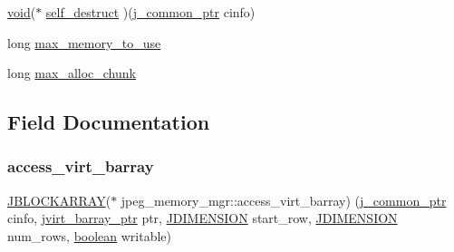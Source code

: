 \begin{DoxyCompactItemize}
\item 
\hyperlink{png_8h_ac9c84fa68bbad002983e35ce3663c686}{void}($\ast$ \hyperlink{structjpeg__memory__mgr_a495eef3a25dd3a34161a4e6f671cc6d7}{self\+\_\+destruct} )(\hyperlink{jpeglib_8h_a1a177ab705cefea8f30ec31a48e62650}{j\+\_\+common\+\_\+ptr} cinfo)
\item 
long \hyperlink{structjpeg__memory__mgr_aa7ef7c0d7ffbfcbee837ae9cb8b12c7e}{max\+\_\+memory\+\_\+to\+\_\+use}
\item 
long \hyperlink{structjpeg__memory__mgr_a0301712c8796bb5555093d72b37c5a58}{max\+\_\+alloc\+\_\+chunk}
\end{DoxyCompactItemize}


\subsection{Field Documentation}
\mbox{\label{structjpeg__memory__mgr_aad382fe923ef84b780a0fb6d6af0e6a0}} 
\subsubsection{\texorpdfstring{access\+\_\+virt\+\_\+barray}{access\_virt\_barray}}
{\footnotesize\ttfamily \hyperlink{jpeglib_8h_ab03cfeb937b60b9b73ca6e3cf935af49}{J\+B\+L\+O\+C\+K\+A\+R\+R\+AY}($\ast$ jpeg\+\_\+memory\+\_\+mgr\+::access\+\_\+virt\+\_\+barray) (\hyperlink{jpeglib_8h_a1a177ab705cefea8f30ec31a48e62650}{j\+\_\+common\+\_\+ptr} cinfo, \hyperlink{jpeglib_8h_a994f4cba141d82ded90af38e51223f0b}{jvirt\+\_\+barray\+\_\+ptr} ptr, \hyperlink{jmorecfg_8h_a04ed4674f6f1d0d50ec241531e38274f}{J\+D\+I\+M\+E\+N\+S\+I\+ON} start\+\_\+row, \hyperlink{jmorecfg_8h_a04ed4674f6f1d0d50ec241531e38274f}{J\+D\+I\+M\+E\+N\+S\+I\+ON} num\+\_\+rows, \hyperlink{jconfig_8h_a7670a4e8a07d9ebb00411948b0bbf86d}{boolean} writable)}

\mbox{\label{structjpeg__memory__mgr_ad9b919c342db4a8a4687834eec798232}} 
